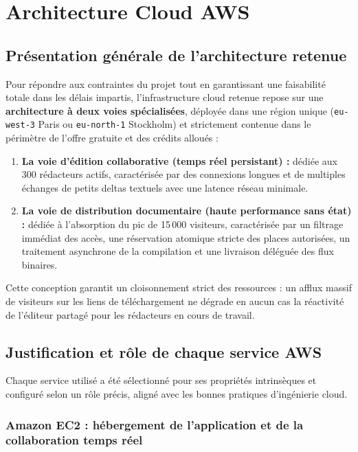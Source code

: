 \chapter{Architecture Cloud AWS}

\section{Présentation générale de l'architecture retenue}

Pour répondre aux contraintes du projet tout en garantissant une faisabilité totale dans les délais impartis, l'infrastructure cloud retenue repose sur une \textbf{architecture à deux voies spécialisées}, déployée dans une région unique (\texttt{eu-west-3} Paris ou \texttt{eu-north-1} Stockholm) et strictement contenue dans le périmètre de l'offre gratuite et des crédits alloués :

\begin{enumerate}
    \item \textbf{La voie d'édition collaborative (temps réel persistant) :} dédiée aux 300 rédacteurs actifs, caractérisée par des connexions longues et de multiples échanges de petits deltas textuels avec une latence réseau minimale.
    \item \textbf{La voie de distribution documentaire (haute performance sans état) :} dédiée à l'absorption du pic de 15\,000 visiteurs, caractérisée par un filtrage immédiat des accès, une réservation atomique stricte des places autorisées, un traitement asynchrone de la compilation et une livraison déléguée des flux binaires.
\end{enumerate}

Cette conception garantit un cloisonnement strict des ressources : un afflux massif de visiteurs sur les liens de téléchargement ne dégrade en aucun cas la réactivité de l'éditeur partagé pour les rédacteurs en cours de travail.

\section{Justification et rôle de chaque service AWS}

Chaque service utilisé a été sélectionné pour ses propriétés intrinsèques et configuré selon un rôle précis, aligné avec les bonnes pratiques d'ingénierie cloud.

\subsection{Amazon EC2 : hébergement de l'application et de la collaboration temps réel}

